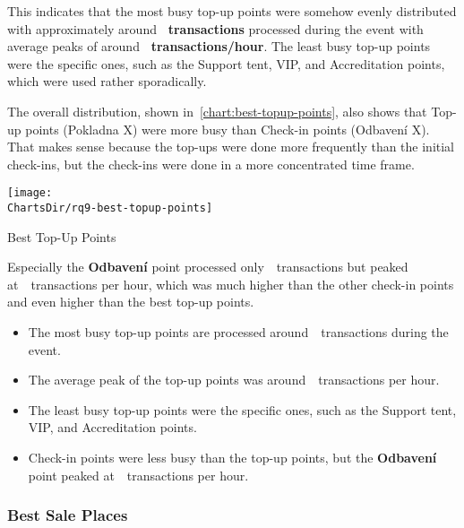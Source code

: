 This indicates that the most busy top-up points were somehow evenly distributed with approximately around \textbf{~transactions} processed during the event with average peaks of around \textbf{~transactions/hour}.
The least busy top-up points were the specific ones, such as the Support tent, VIP, and Accreditation points, which were used rather sporadically.

The overall distribution, shown in~\autoref{chart:best-topup-points}, also shows that Top-up points (Pokladna X) were more busy than Check-in points (Odbavení X).
That makes sense because the top-ups were done more frequently than the initial check-ins, but the check-ins were done in a more concentrated time frame.

\begin{chart}[H]
	\centering
	\texttt{[image: \\ChartsDir/rq9-best-topup-points]}
	\caption{ Best Top-Up Points}
	\label{chart:best-topup-points}
	\source
\end{chart}

Especially the \textbf{Odbavení} point processed only~~transactions but peaked at~~transactions per hour, which was much higher than the other check-in points and even higher than the best top-up points.

\begin{keytakeaways}
	\begin{itemize}
		\item The most busy top-up points are processed around~~transactions during the event.
		\item The average peak of the top-up points was around~~transactions per hour.
		\item The least busy top-up points were the specific ones, such as the Support tent, VIP, and Accreditation points.
		\item Check-in points were less busy than the top-up points, but the \textbf{Odbavení} point peaked at~~transactions per hour.
	\end{itemize}
\end{keytakeaways}

\pagebreak[4]

\subsubsection{Best Sale Places}
\label{subsubsec:analysis-best-sale-points}

